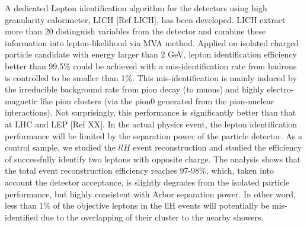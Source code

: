 A dedicated Lepton identification algorithm for the detectors using high granularity calorimeter, LICH [Ref LICH], has been developed.
LICH extract more than 20 distinguish variables from the detector and combine these information into lepton-likelihood via MVA method.
Applied on isolated charged particle candidate with energy larger than 2 GeV,
lepton identification efficiency better than 99.5\% could be achieved with a mis-identification rate from hadrons
is controlled to be smaller than 1\%.
This mis-identification is mainly induced by the irreducible background rate from pion decay (to muons)
and highly electro-magnetic like pion clusters (via the pion0 generated from the pion-nuclear interactions).
Not surprisingly, this performance is significantly better than that at LHC and LEP [Ref XX]. 
In the actual physics event, the lepton identification performance will be limited by the separation power of the particle detector.
As a control sample, we studied the $llH$ event reconstruction
and studied the efficiency of successfully identify two leptons with opposite charge.
The analysis shows that the total event reconstruction efficiency reaches 97-98\%,
which, taken into account the detector acceptance, is slightly degrades from the isolated particle performance,
but highly consistent with Arbor separation power.
In other word, less than 1\% of the objective leptons in the llH events will potentially be mis-identified
due to the overlapping of their cluster to the nearby showers. 

